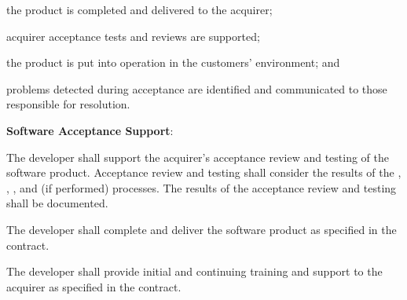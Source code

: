 			\begin{adjustwidth}{2em}{0pt} 

				\begin{compactitem}

					\item the product is completed and delivered to the acquirer;

					\item acquirer acceptance tests and reviews are supported;

					\item the product is put into operation in the customers’ environment; and

					\item problems detected during acceptance are identified and communicated to those responsible for resolution.

				\end{compactitem}

			\end{adjustwidth}

			\begin{adjustwidth}{2em}{0pt} 

				\begin{compactenum}

					\item {\bf Software Acceptance Support}:

					\begin{compactenum}

						\item The developer shall support the acquirer's acceptance review and testing of the software product. Acceptance review and testing shall consider the results of the , , , and  (if performed) processes. The results of the acceptance review and testing shall be documented.

						\item The developer shall complete and deliver the software product as specified in the contract.

						\item The developer shall provide initial and continuing training and support to the acquirer as specified in the contract.

					\end{compactenum}

				\end{compactenum}

			\end{adjustwidth}


